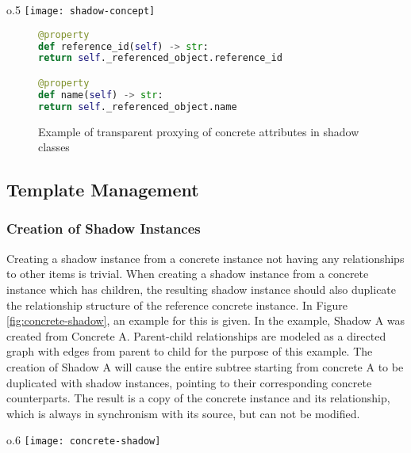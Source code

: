         \begin{wrapfigure}{o}{.5\textwidth}
            \centering
            \texttt{[image: shadow-concept]}
            \caption{Schematic depiction of the relationship between concrete \& shadow instances}
            \label{fig:shadow-concept}
        \end{wrapfigure}

        \begin{figure}[H]
            \begin{lstlisting}[language=Python,frame=lines,backgroundcolor=\color{background},firstnumber=285]
@property
def reference_id(self) -> str:
return self._referenced_object.reference_id

@property
def name(self) -> str:
return self._referenced_object.name
            \end{lstlisting}
            \caption{Example of transparent proxying of concrete attributes in shadow classes}
        \end{figure}

\subsection{Template Management}

    \subsubsection{Creation of Shadow Instances}
        Creating a shadow instance from a concrete instance not having
        any relationships to other items is trivial.
        When creating a shadow instance from a concrete instance
        which has children, the resulting shadow
        instance should also duplicate the relationship structure
        of the reference concrete instance. In Figure \ref{fig:concrete-shadow},
        an example for this is given. In the example, Shadow A
        was created from Concrete A. Parent-child relationships
        are modeled as a directed graph with edges from parent to child for the 
        purpose of this example. The creation of Shadow A will cause the
        entire subtree starting from concrete A to be duplicated
        with shadow instances, pointing to their corresponding
        concrete counterparts. The result is a copy of the
        concrete instance and its relationship, which is always
        in synchronism with its source, but can not be modified.

        \begin{wrapfigure}{o}{.6\textwidth}
            \centering
            \texttt{[image: concrete-shadow]}
            \caption{Shadow instances duplicate the structure of the concrete items}
            \label{fig:concrete-shadow}
        \end{wrapfigure}


